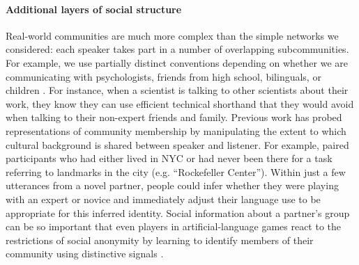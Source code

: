 
\paragraph{Additional layers of social structure}

Real-world communities are much more complex than the simple networks we considered: each speaker takes part in a number of overlapping subcommunities. 
For example, we use partially distinct conventions depending on whether we are communicating with psychologists, friends from high school, bilinguals, or children \cite{auer_code-switching_2013}.
For instance, when a scientist is talking to other scientists about their work, they know they can use efficient technical shorthand that they would avoid when talking to their non-expert friends and family. 
Previous work has probed representations of community membership by manipulating the extent to which cultural background is shared between speaker and listener.
For example,  paired participants who had either lived in NYC or had never been there for a task referring to landmarks in the city (e.g. ``Rockefeller Center''). 
Within just a few utterances from a novel partner, people could infer whether they were playing with an expert or novice and immediately adjust their language use to be appropriate for this inferred identity. 
Social information about a partner’s group can be so important that even players in artificial-language games react to the restrictions of social anonymity by learning to identify members of their community using distinctive signals \cite{roberts_experimental_2010}.

